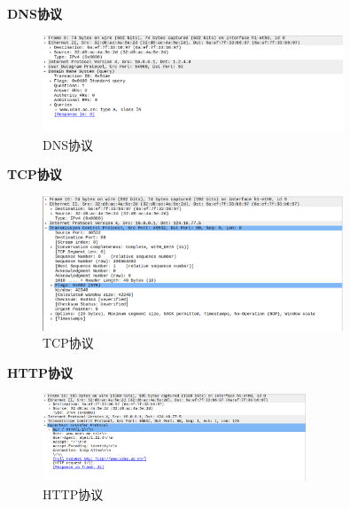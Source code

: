 \documentclass[11pt]{article}
\begin{document}
\newpage 

\textbf{DNS协议}

\begin{figure} [htbp]
  \centering
  \includegraphics[width=0.8\textwidth]{fig/dns.png}
  \caption{DNS协议}
  \label{fig:DNS}
\end{figure}

 
\textbf{TCP协议}

\begin{figure} [htbp]
  \centering
  \includegraphics[width=0.8\textwidth]{fig/tcp.png}
  \caption{TCP协议}
  \label{fig:TCP}
\end{figure}

\textbf{HTTP协议}

\begin{figure} [htbp]
  \centering
  \includegraphics[width=0.7\textwidth]{fig/http.png}
  \caption{HTTP协议}
  \label{fig:HTTP}

\end{figure}

\newpage
\end{document}
